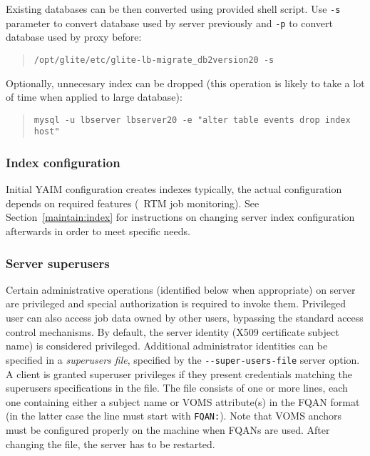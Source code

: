 Existing databases can be then converted using provided shell script. Use \verb'-s' parameter to convert database used by \LB server previously and \verb'-p' to convert database used by \LB proxy before:
\begin{quote}
\verb'/opt/glite/etc/glite-lb-migrate_db2version20 -s'
\end{quote}

Optionally, unnecesary index can be dropped (this operation is likely to take a lot of time when applied to large database):
\begin{quote}
\verb'mysql -u lbserver lbserver20 -e "alter table events drop index host"'
\end{quote}



\subsubsection{Index configuration}

Initial YAIM configuration creates \LB indexes typically,
the actual configuration depends on required features (\eg\ RTM job monitoring).
See Section~\ref{maintain:index} for instructions
on changing \LB server index configuration afterwards in order
to meet specific needs.


\subsubsection{Server superusers}
\label{inst:superusers}

Certain administrative operations (identified below when appropriate) on \LB
server are privileged and special authorization is required to invoke them.
Privileged user can also access job data owned by other users, bypassing the
standard \LB access control mechanisms.  By default, the \LB server identity
(X509 certificate subject name) is considered privileged.  Additional
administrator identities can be specified in a \emph{superusers file},
specified by the \verb'--super-users-file' server option.  A client is granted
superuser privileges if they present credentials matching the superusers
specifications in the file.  The file consists of one or more lines, each one
containing either a subject name or VOMS attribute(s) in the FQAN format (in
the latter case the line must start with \verb'FQAN:').  Note that VOMS anchors
must be configured properly on the \LB machine when FQANs are used.  After
changing the file, the server has to be restarted. 

